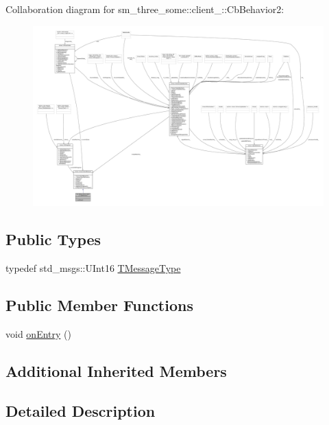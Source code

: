 Collaboration diagram for sm\+\_\+three\+\_\+some\+:\+:client\+\_\+:\+:Cb\+Behavior2\+:
\nopagebreak
\begin{figure}[H]
\begin{center}
\leavevmode
\includegraphics[width=350pt]{classsm__three__some_1_1client__2_1_1CbBehavior2__coll__graph}
\end{center}
\end{figure}
\subsection*{Public Types}
\begin{DoxyCompactItemize}
\item 
typedef std\+\_\+msgs\+::\+U\+Int16 \hyperlink{classsm__three__some_1_1client__2_1_1CbBehavior2_a2283eb6f6db52ef406fc0e2ec0a826c9}{T\+Message\+Type}
\end{DoxyCompactItemize}
\subsection*{Public Member Functions}
\begin{DoxyCompactItemize}
\item 
void \hyperlink{classsm__three__some_1_1client__2_1_1CbBehavior2_aed6b08c5356d215fffc639493a363f48}{on\+Entry} ()
\end{DoxyCompactItemize}
\subsection*{Additional Inherited Members}


\subsection{Detailed Description}


